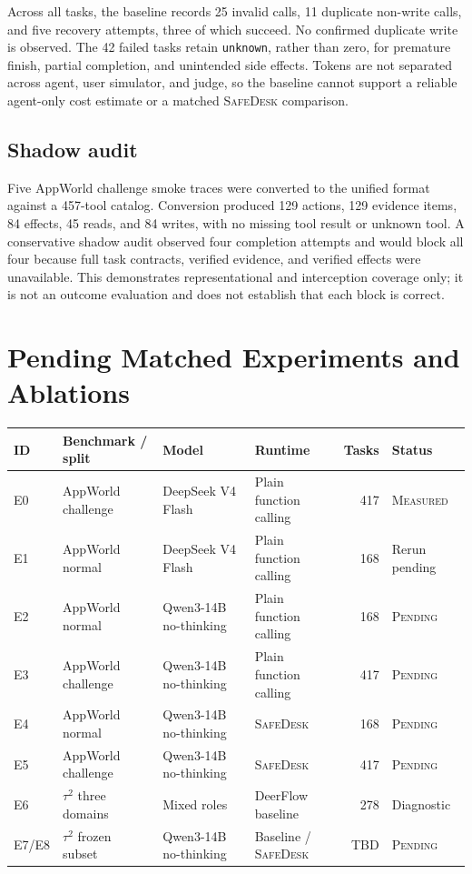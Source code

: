 \documentclass[10pt]{article}
\newcommand{\safedesk}{\textsc{SafeDesk}}
\newcommand{\pending}{\textsc{Pending}}
\newcommand{\measured}{\textsc{Measured}}
\begin{document}
Across all tasks, the baseline records 25 invalid calls, 11 duplicate non-write
calls, and five recovery attempts, three of which succeed. No confirmed duplicate
write is observed. The 42 failed tasks retain \texttt{unknown}, rather than zero,
for premature finish, partial completion, and unintended side effects. Tokens are
not separated across agent, user simulator, and judge, so the baseline cannot
support a reliable agent-only cost estimate or a matched \safedesk{} comparison.

\subsection{Shadow audit}

Five AppWorld challenge smoke traces were converted to the unified format against
a 457-tool catalog. Conversion produced 129 actions, 129 evidence items, 84
effects, 45 reads, and 84 writes, with no missing tool result or unknown tool. A
conservative shadow audit observed four completion attempts and would block all
four because full task contracts, verified evidence, and verified effects were
unavailable. This demonstrates representational and interception coverage only;
it is not an outcome evaluation and does not establish that each block is correct.

\section{Pending Matched Experiments and Ablations}

\begin{center}
\begin{minipage}{\linewidth}
\centering
{}
\label{tab:experiments}
\small
\begin{tabularx}{\linewidth}{@{}lYYYrl@{}}
\toprule
ID & Benchmark / split & Model & Runtime & Tasks & Status \\
\midrule
E0 & AppWorld challenge & DeepSeek V4 Flash & Plain function calling & 417 & \measured \\
E1 & AppWorld normal & DeepSeek V4 Flash & Plain function calling & 168 & Rerun pending \\
E2 & AppWorld normal & Qwen3-14B no-thinking & Plain function calling & 168 & \pending \\
E3 & AppWorld challenge & Qwen3-14B no-thinking & Plain function calling & 417 & \pending \\
E4 & AppWorld normal & Qwen3-14B no-thinking & \safedesk & 168 & \pending \\
E5 & AppWorld challenge & Qwen3-14B no-thinking & \safedesk & 417 & \pending \\
E6 & $\tau^2$ three domains & Mixed roles & DeerFlow baseline & 278 & Diagnostic \\
E7/E8 & $\tau^2$ frozen subset & Qwen3-14B no-thinking & Baseline / \safedesk & TBD & \pending \\
\bottomrule
\end{tabularx}
\end{minipage}
\end{center}
\end{document}
